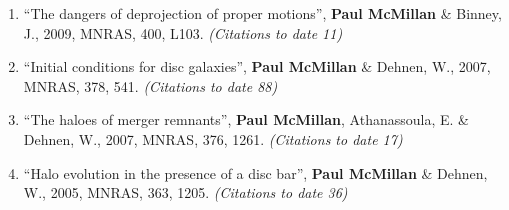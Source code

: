\documentclass{resume}
\begin{document}
\begin{enumerate}
\item ``The dangers of deprojection of proper motions'', \textbf{Paul McMillan} \& Binney, J., 2009, MNRAS, 400, L103. \textit{(Citations to date 11)}

\item ``Initial conditions for disc galaxies'', \textbf{Paul McMillan} \& Dehnen, W., 2007, MNRAS, 378, 541. \textit{(Citations to date 88)}

\item ``The haloes of merger remnants'', \textbf{Paul McMillan}, Athanassoula, E. \& Dehnen, W., 2007, MNRAS, 376, 1261. \textit{(Citations to date 17)}

\item ``Halo evolution in the presence of a disc bar'', \textbf{Paul McMillan} \& Dehnen, W., 2005, MNRAS, 363, 1205. \textit{(Citations to date 36)}

\end{enumerate}
\end{document}

